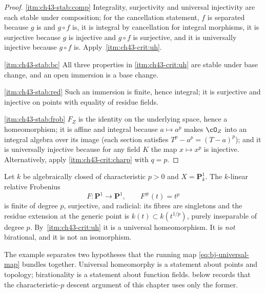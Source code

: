 \begin{proof}
\cref{itm:ch43-stab:comp} Integrality, surjectivity and universal
injectivity are each stable under composition; for the cancellation
statement, $f$ is separated because $g$ is and $g\circ f$ is, it is
integral by cancellation for integral morphisms, it is surjective because
$g$ is injective and $g\circ f$ is surjective, and it is universally
injective because $g\circ f$ is.  Apply
\,\cref{itm:ch43-crit:uh}.

\cref{itm:ch43-stab:bc} All three properties in
\cref{itm:ch43-crit:uh} are stable under base change, and an open
immersion is a base change.

\cref{itm:ch43-stab:red} Such an immersion is finite, hence integral;
it is surjective and injective on points with equality of residue fields.

\cref{itm:ch43-stab:frob} $F_Z$ is the identity on the underlying
space, hence a homeomorphism; it is affine and integral because
$a\mapsto a^p$ makes $\cO_Z$ into an integral algebra over its image
(each section satisfies $T^p-a^p=(T-a)^p$); and it is universally
injective because for any field $K$ the map $x\mapsto x^p$ is injective.
Alternatively, apply \cref{itm:ch43-crit:charp} with $q=p$.
\end{proof}

\begin{example}
\label{ex:ch43-frobenius-uh}
Let $k$ be algebraically closed of characteristic $p>0$ and
$X=\mathbf P^1_k$.  The $k$-linear relative Frobenius
\[
 F:\mathbf P^1\longrightarrow\mathbf P^1,
 \qquad
 F^\#(t)=t^p
\]
is finite of degree $p$, surjective, and radicial: its fibres are
singletons and the residue extension at the generic point is
$k(t)\subset k(t^{1/p})$, purely inseparable of degree $p$.  By
\,\cref{itm:ch43-crit:uh} it is a universal
homeomorphism.  It is \emph{not} birational, and it is not an isomorphism.

The example separates two hypotheses that the running map
\eqref{eq:bj-universal-map} bundles together.  Universal homeomorphy is a
statement about points and topology; birationality is a statement about
function fields.   below records
that the characteristic-$p$ descent argument of this chapter uses only the
former.
\end{example}

